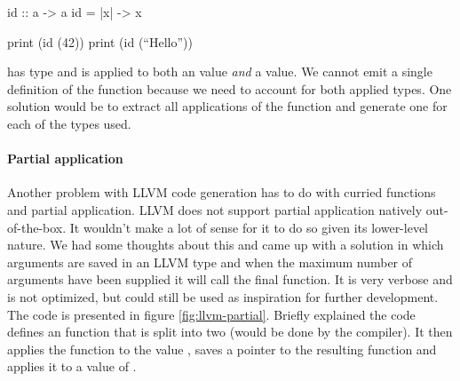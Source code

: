 \begin{kite}
id :: a -> a
id = |x| -> { x }

print (id (42))
print (id (``Hello''))
\end{kite}

 has type  and is applied to both an  value \emph{and} a \code{[Char]} value. We cannot emit a single definition of the function because we need to account for both applied types. One solution would be to extract all applications of the function and generate one for each of the types used.

\paragraph{Partial application}
Another problem with LLVM code generation has to do with curried functions and partial application. LLVM does not support partial application natively out-of-the-box. It wouldn't make a lot of sense for it to do so given its lower-level nature. We had some thoughts about this and came up with a solution in which arguments are saved in an LLVM  type and when the maximum number of arguments have been supplied it will call the final function. It is very verbose and is not optimized, but could still be used as inspiration for further development. The code is presented in figure \ref{fig:llvm-partial}. Briefly explained the code defines an  function that is split into two (would be done by the compiler). It then applies the function to the value , saves a pointer to the resulting function and applies it to a value of .

